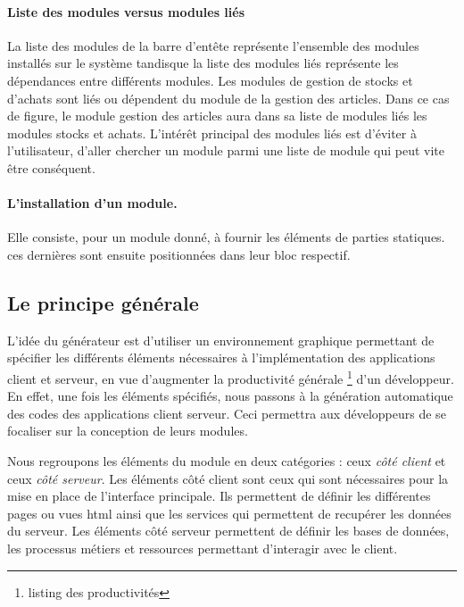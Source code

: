 \documentclass[a4paper,11pt]{report}
\begin{document}
\paragraph{Liste des modules versus modules liés}
La liste des modules de la barre d'entête représente l'ensemble des
modules installés sur le système tandisque la liste des modules liés
représente les dépendances entre différents modules. Les modules de
gestion de stocks et d'achats sont liés ou dépendent du module de la
gestion des articles. Dans ce cas de figure, le module gestion des
articles aura dans sa liste de modules liés les modules stocks et
achats. L'intérêt principal des modules liés est d'éviter à
l'utilisateur, d'aller chercher un module parmi une liste de module
qui peut vite être conséquent.

\paragraph{L'installation d'un module.}
Elle consiste, pour un module donné, à  fournir les éléments de
parties statiques. ces dernières sont ensuite positionnées dans leur
bloc respectif.

\subsection{Le principe générale}

L'idée du générateur est d'utiliser un environnement graphique
permettant de spécifier les différents éléments nécessaires à
l'implémentation des applications client et serveur, en vue d'augmenter
la productivité générale \footnote{listing des productivités} d'un développeur. En effet, une fois les
éléments spécifiés, nous passons à la génération automatique des codes
des applications client serveur. Ceci permettra aux développeurs de se
focaliser sur la conception de leurs modules.

Nous regroupons les éléments du module en deux catégories : ceux {\em
  côté client } et ceux {\em côté serveur}.
Les éléments côté client sont ceux qui sont nécessaires pour la mise
en place de l'interface principale. Ils permettent de définir les
différentes pages ou vues html ainsi que les services qui permettent
de recupérer les données du serveur.
Les éléments côté serveur permettent de définir les bases de données,
les processus métiers et ressources permettant d'interagir avec le
client.
\end{document}
